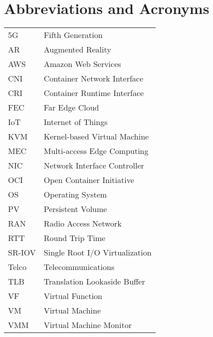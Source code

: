 \chapter*{Abbreviations and Acronyms}

\noindent
\begin{longtable}{@{}p{}p{}@{}}
5G & Fifth Generation \\
AR & Augmented Reality \\
AWS & Amazon Web Services \\
CNI & Container Network Interface \\
CRI & Container Runtime Interface \\
FEC & Far Edge Cloud \\
IoT & Internet of Things \\
KVM & Kernel-based Virtual Machine \\
MEC & Multi-access Edge Computing \\
NIC & Network Interface Controller \\
OCI & Open Container Initiative \\
OS & Operating System \\
PV & Persistent Volume \\
RAN & Radio Access Network \\
RTT & Round Trip Time \\
SR-IOV & Single Root I/O Virtualization \\
Telco & Telecommunications \\
TLB & Translation Lookaside Buffer \\
VF & Virtual Function \\
VM & Virtual Machine \\
VMM & Virtual Machine Monitor \\

\end{longtable}
